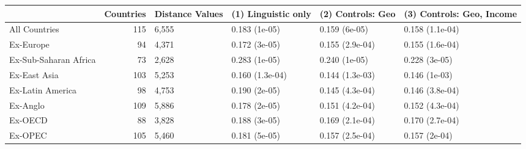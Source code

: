 \documentclass[preprint,10pt]{elsarticle}
\begin{document}
\begin{table}[ht]
\centering
\begin{tabular}{lrp{1.2cm}p{2.3cm}p{2.3cm}p{2.3cm}}
  \hline
 & Countries & Distance \hspace{20 mm} Values & (1) Linguistic \hspace{20 mm} only & (2) Controls: \hspace{20 mm} Geo & (3) Controls: \hspace{20 mm} Geo, Income \\ 
  \hline
All Countries & 115 & 6,555 & 0.183 (1e-05) & 0.159 (6e-05) & 0.158 (1.1e-04) \\ 
  Ex-Europe &  94 & 4,371 & 0.172 (3e-05) & 0.155 (2.9e-04) & 0.155 (1.6e-04) \\ 
  Ex-Sub-Saharan Africa &  73 & 2,628 & 0.283 (1e-05) & 0.240 (1e-05) & 0.228 (3e-05) \\ 
  Ex-East Asia & 103 & 5,253 & 0.160 (1.3e-04) & 0.144 (1.3e-03) & 0.146 (1e-03) \\ 
  Ex-Latin America &  98 & 4,753 & 0.190 (2e-05) & 0.145 (4.3e-04) & 0.146 (3.8e-04) \\ 
  Ex-Anglo & 109 & 5,886 & 0.178 (2e-05) & 0.151 (4.2e-04) & 0.152 (4.3e-04) \\ 
  Ex-OECD &  88 & 3,828 & 0.188 (3e-05) & 0.169 (2.1e-04) & 0.170 (2.7e-04) \\ 
  Ex-OPEC & 105 & 5,460 & 0.181 (5e-05) & 0.157 (2.5e-04) & 0.157 (2e-04) \\ 
   \hline
\end{tabular}
\end{table}
\end{document}
